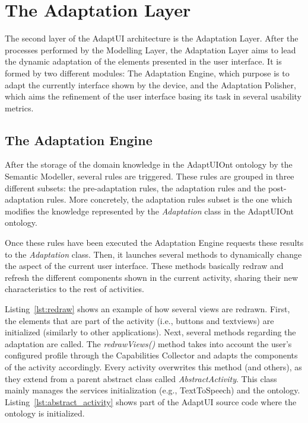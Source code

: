 \section{The Adaptation Layer}
\label{sec:adaptation_layer}

The second layer of the AdaptUI architecture is the Adaptation Layer. After the
processes performed by the Modelling Layer, the Adaptation Layer aims to lead the
dynamic adaptation of the elements presented in the user interface. It is formed
by two different modules: The Adaptation Engine, which purpose is to adapt the
currently interface shown by the device, and the Adaptation Polisher, which aims
the refinement of the user interface basing its task in several usability metrics.


\subsection{The Adaptation Engine}
\label{sec:adaptation_engine}

After the storage of the domain knowledge in the AdaptUIOnt ontology by the
Semantic Modeller, several rules are triggered. These rules are grouped in three
different subsets: the pre-adaptation rules, the adaptation rules and the post-adaptation
rules. More concretely, the adaptation rules subset is the one which modifies
the knowledge represented by the \textit{Adaptation} class in the AdaptUIOnt
ontology.

Once these rules have been executed the Adaptation Engine requests these results
to the \textit{Adaptation} class. Then, it launches several methods to dynamically
change the aspect of the current user interface. These methods basically redraw
and refresh the different components shown in the current activity, sharing
their new characteristics to the rest of activities. 

Listing~\ref{lst:redraw} shows an example of how several views are redrawn.
First, the elements that are part of the activity (i.e., buttons and textviews)
are initialized (similarly to other applications). Next, several methods regarding
the adaptation are called. The \textit{redrawViews()} method takes into account
the user's configured profile through the Capabilities Collector and adapts the
components of the activity accordingly. Every activity overwrites this method
(and others), as they extend from a parent abstract class called
\textit{AbstractActivity}. This class mainly manages the services initialization
(e.g., TextToSpeech) and the ontology. Listing~\ref{lst:abstract_activity} shows
part of the AdaptUI source code where the ontology is initialized.


